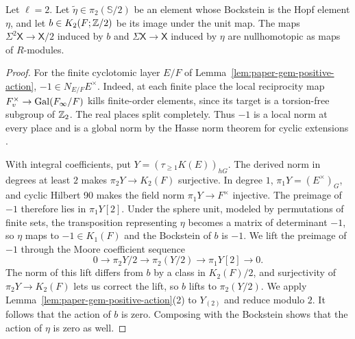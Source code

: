 \begin{lemma}\label{lem:paper-gem-bott}
Let $\ell=2$.
Let $\widetilde\eta\in\pi_2(\mathbb S/2)$ be an element whose Bockstein is the Hopf element $\eta$, and let $b\in K_2(F;\mathbb Z/2)$ be its image under the unit map.
The maps $\Sigma^2 \mathsf{X}\to \mathsf{X}/2$ induced by $b$ and $\Sigma \mathsf{X}\to \mathsf{X}$ induced by $\eta$ are nullhomotopic as maps of $R$-modules.
\end{lemma}
\begin{proof}
For the finite cyclotomic layer $E/F$ of Lemma~\ref{lem:paper-gem-positive-action}, $-1\in N_{E/F}E^\times$.
Indeed, at each finite place the local reciprocity map $F_v^\times\to\operatorname{Gal}(F_\infty/F)$ kills finite-order elements, since its target is a torsion-free subgroup of $\mathbb Z_2$.
The real places split completely.
Thus $-1$ is a local norm at every place and is a global norm by the Hasse norm theorem for cyclic extensions \cite[\S1]{HasseNorm1931}.

With integral coefficients, put $Y=(\tau_{\ge1}K(E))_{hG}$.
The derived norm in degrees at least $2$ makes $\pi_2Y\to K_2(F)$ surjective.
In degree $1$, $\pi_1Y=(E^\times)_G$, and cyclic Hilbert 90 makes the field norm $\pi_1Y\to F^\times$ injective.
The preimage of $-1$ therefore lies in $\pi_1Y[2]$.
Under the sphere unit, modeled by permutations of finite sets, the transposition representing $\eta$ becomes a matrix of determinant $-1$, so $\eta$ maps to $-1\in K_1(F)$ and the Bockstein of $b$ is $-1$.
We lift the preimage of $-1$ through the Moore coefficient sequence
\[
 0\longrightarrow \pi_2Y/2\longrightarrow\pi_2(Y/2)
   \longrightarrow\pi_1Y[2]\longrightarrow0.
\]
The norm of this lift differs from $b$ by a class in $K_2(F)/2$, and surjectivity of $\pi_2Y\to K_2(F)$ lets us correct the lift, so $b$ lifts to $\pi_2(Y/2)$.
We apply Lemma~\ref{lem:paper-gem-positive-action}(2) to $Y_{(2)}$ and reduce modulo $2$.
It follows that the action of $b$ is zero.
Composing with the Bockstein shows that the action of $\eta$ is zero as well.
\end{proof}

